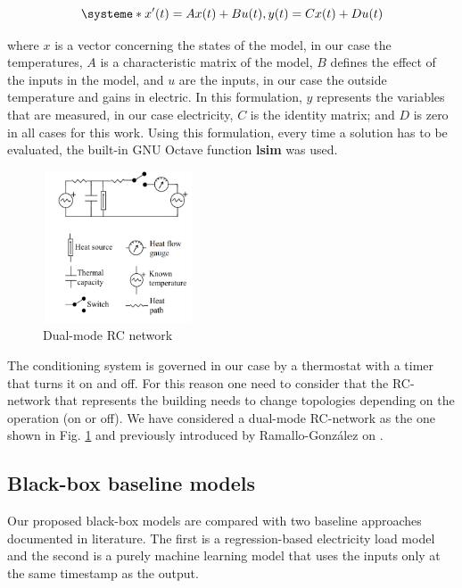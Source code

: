 \documentclass[10pt, conference, compsocconf]{IEEEtran}
\begin{document}
\begin{equation}\label{eq1}
\systeme*{x'(t)=Ax(t) + Bu(t), y(t)= Cx(t) + Du(t)}
\end{equation}

where $x$ is a vector concerning the states of the model, in our case the temperatures, $A$ is a characteristic matrix of the model, $B$ defines the effect of the inputs in the model, and $u$ are the inputs, in our case the outside temperature and gains in electric. In this formulation, $y$ represents the variables that are measured, in our case electricity, $C$ is the identity matrix; and $D$ is zero in all cases for this work. Using this formulation, every time a solution has to be evaluated, the built-in GNU Octave function \textbf{lsim} was used.

\begin{figure}[h]%
\centering
\centerline{\includegraphics[width=4.5cm,height=4.5cm,keepaspectratio]{./pics/figAlf.pdf}}
\caption{Dual-mode RC network}\vspace*{-6pt}
  \label{fig:alf}
\end{figure}

The conditioning system is governed in our case by a thermostat with a timer that turns it on and off. For this reason one need to consider that the RC-network that represents the building needs to change topologies depending on the operation (on or off). We have considered a dual-mode RC-network as the one shown in Fig. \ref{fig:alf} and previously introduced by Ramallo-Gonz\'alez on \cite{ramalloidentifying}.



\subsection{Black-box baseline models}

Our proposed black-box models are compared with two baseline approaches documented in literature. The first is a regression-based electricity load model and the second is a purely machine learning model that uses the inputs only at the same timestamp as the output.
\end{document}
